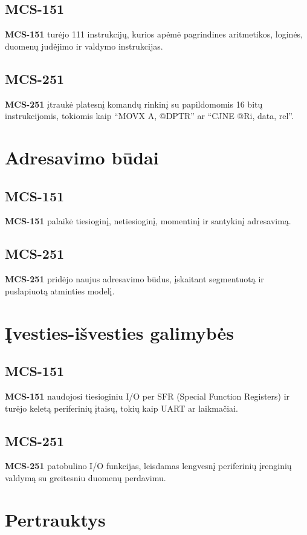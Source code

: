 \documentclass[a4paper,12pt]{article}
\begin{document}
\subsection{MCS-151}
\textbf{MCS-151} turėjo 111 instrukcijų, kurios apėmė pagrindines aritmetikos, loginės, duomenų judėjimo ir valdymo instrukcijas.

\subsection{MCS-251}
\textbf{MCS-251} įtraukė platesnį komandų rinkinį su papildomomis 16 bitų instrukcijomis, tokiomis kaip “MOVX A, @DPTR” ar “CJNE @Ri, data, rel”.


 
\section{Adresavimo būdai}
\subsection{MCS-151}
\textbf{MCS-151} palaikė tiesioginį, netiesioginį, momentinį ir santykinį adresavimą.

\subsection{MCS-251}
\textbf{MCS-251} pridėjo naujus adresavimo būdus, įskaitant segmentuotą ir puslapiuotą atminties modelį.

\newpage
 
\section{Įvesties-išvesties galimybės}
\subsection{MCS-151}
\textbf{MCS-151} naudojosi tiesioginiu I/O per SFR (Special Function Registers) ir turėjo keletą periferinių įtaisų, tokių kaip UART ar laikmačiai.

\subsection{MCS-251}
\textbf{MCS-251} patobulino I/O funkcijas, leisdamas lengvesnį periferinių įrenginių valdymą su greitesniu duomenų perdavimu.


 
\section{Pertrauktys}
\end{document}
